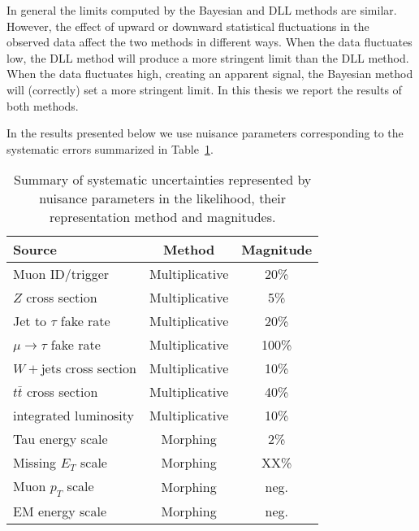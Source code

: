 In general the limits computed by the Bayesian and DLL methods are similar.
However, the effect of upward or downward statistical fluctuations in the
observed data affect the two methods in different ways.  When the data
fluctuates low, the DLL method will produce a more stringent limit than the
DLL method.  When the data fluctuates high, creating an apparent signal, the
Bayesian method will (correctly) set a more stringent limit.  In this thesis we
report the results of both methods.
%

In the results presented below we use nuisance parameters corresponding
to the systematic errors summarized in Table~\ref{tab-sys}.
\begin{table}
  \begin{center}
    \begin{tabular}{|l|c|c|} \hline
  Source                 &       Method      &   Magnitude  \\ \hline
Muon ID/trigger          &  Multiplicative   &    20\%      \\
$Z$ cross section        &  Multiplicative   &     5\%      \\
Jet to $\tau$ fake rate  &  Multiplicative   &    20\%      \\
$\mu\to\tau$ fake rate   &  Multiplicative   &   100\%      \\
$W+$jets cross section   &  Multiplicative   &    10\%      \\
$t\bar{t}$ cross section &  Multiplicative   &    40\%      \\
integrated luminosity    &  Multiplicative   &    10\%      \\
Tau energy scale         &  Morphing         &     2\%      \\
Missing $E_T$ scale      &  Morphing         &     XX\%      \\
Muon $p_T$ scale         &  Morphing         &   neg.       \\
EM energy scale          &  Morphing         &   neg.       \\ \hline
    \end{tabular}
   \end{center}
  \caption{Summary of systematic uncertainties represented by nuisance 
           parameters in the likelihood, their representation method 
           and magnitudes.\label{tab-sys}}
\end{table}


\ifx\master\undefined\fi
